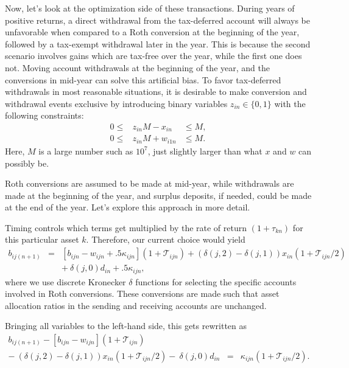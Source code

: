 \documentclass{report}[fleqn,12pt]
\begin{document}
	Now, let's look at the optimization side of these transactions.
	During years of positive returns,
	a direct withdrawal from the tax-deferred account will always
	be unfavorable when compared to a Roth conversion
	at the beginning of the year, followed
	by a tax-exempt withdrawal later in the year.
	This is because the second
	scenario involves gains which are tax-free over the year, while
	the first one does not. Moving account withdrawals at the beginning
	of the year, and the conversions in mid-year can solve this artificial bias.
	To favor tax-deferred withdrawals in most reasonable situations,
	it is desirable to make conversion and withdrawal events exclusive 
	by introducing binary variables $z_{in} \in \{0, 1\}$ with the following constraints:
	\begin{eqnarray}
		\label{Eq:Binary}
		0 \le& z_{in}M - x_{in} &\le M, \nonumber \\
		0 \le& z_{in}M + w_{i1n} &\le M.
	\end{eqnarray}
	Here, $M$ is a large number such as $10^7$, just slightly
	larger than what $x$ and $w$ can possibly be.

	Roth conversions are assumed to be made at mid-year, while withdrawals
	are made at the beginning of the year, and surplus deposits,
	if needed, could be made at the end of the year. Let's explore this approach
	in more detail.

	Timing controls which terms get multiplied by the rate of return $(1 + \tau_{kn})$
	for this particular asset $k$.
	Therefore, our current choice would yield
	\begin{eqnarray}
		\label{Eq:C3a}
		b_{ij(n+1)} &=& [b_{ijn} - w_{ijn} + .5\kappa_{ijn}](1 + \mathcal{T}_{ijn})
		+ (\delta(j, 2) - \delta(j, 1))x_{in} (1 + \mathcal{T}_{ijn}/2)
		\nonumber \\
		&& 
		+\ \delta(j, 0) d_{in} + .5 \kappa_{ijn},
	\end{eqnarray}
	where we use discrete Kronecker $\delta$ functions for selecting the specific accounts involved
	in Roth conversions. These conversions are made such that asset allocation
	ratios in the sending and receiving accounts are unchanged.

	Bringing all variables
	to the left-hand side, this gets rewritten as
	\begin{eqnarray}
		\label{Eq:C3}
		b_{ij(n+1)} - [b_{ijn} - w_{ijn}] (1 + \mathcal{T}_{ijn})
		&& \nonumber \\
		-\ (\delta(j, 2) - \delta(j, 1))x_{in}(1 + \mathcal{T}_{ijn}/2)
		-\ \delta(j, 0) d_{in}
		&=& \kappa_{ijn} (1 + \mathcal{T}_{ijn}/2).
	\end{eqnarray}
\end{document}
